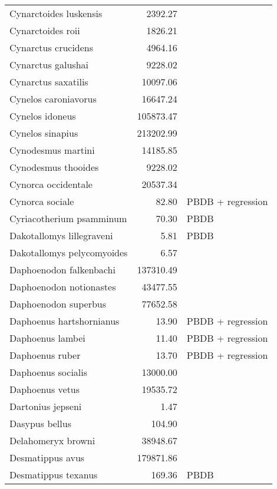 \begin{table}[ht]
\begin{tabular}{lrl}
  Cynarctoides luskensis & 2392.27 & \cite{Tomiya2013} \\ 
  Cynarctoides roii & 1826.21 & \cite{Tomiya2013} \\ 
  Cynarctus crucidens & 4964.16 & \cite{Tomiya2013} \\ 
  Cynarctus galushai & 9228.02 & \cite{Tomiya2013} \\ 
  Cynarctus saxatilis & 10097.06 & \cite{Tomiya2013} \\ 
  Cynelos caroniavorus & 16647.24 & \cite{Tomiya2013} \\ 
  Cynelos idoneus & 105873.47 & \cite{Tomiya2013} \\ 
  Cynelos sinapius & 213202.99 & \cite{Tomiya2013} \\ 
  Cynodesmus martini & 14185.85 & \cite{Tomiya2013} \\ 
  Cynodesmus thooides & 9228.02 & \cite{Tomiya2013} \\ 
  Cynorca occidentale & 20537.34 & \cite{Tomiya2013} \\ 
  Cynorca sociale & 82.80 & PBDB + regression \\ 
  Cyriacotherium psamminum & 70.30 & PBDB \\ 
  Dakotallomys lillegraveni & 5.81 & PBDB \\ 
  Dakotallomys pelycomyoides & 6.57 & \cite{Mihlbacher2006} \\ 
  Daphoenodon falkenbachi & 137310.49 & \cite{Tomiya2013} \\ 
  Daphoenodon notionastes & 43477.55 & \cite{Tomiya2013} \\ 
  Daphoenodon superbus & 77652.58 & \cite{Tomiya2013} \\ 
  Daphoenus hartshornianus & 13.90 & PBDB + regression \\ 
  Daphoenus lambei & 11.40 & PBDB + regression \\ 
  Daphoenus ruber & 13.70 & PBDB + regression \\ 
  Daphoenus socialis & 13000.00 & \cite{McKenna2011} \\ 
  Daphoenus vetus & 19535.72 & \cite{Tomiya2013} \\ 
  Dartonius jepseni & 1.47 & \cite{Hay1969} \\ 
  Dasypus bellus & 104.90 & \cite{Smith2004} \\ 
  Delahomeryx browni & 38948.67 & \cite{Tomiya2013} \\ 
  Desmatippus avus & 179871.86 & \cite{Tomiya2013} \\ 
  Desmatippus texanus & 169.36 & PBDB \\ 

\end{tabular}
\end{table}
